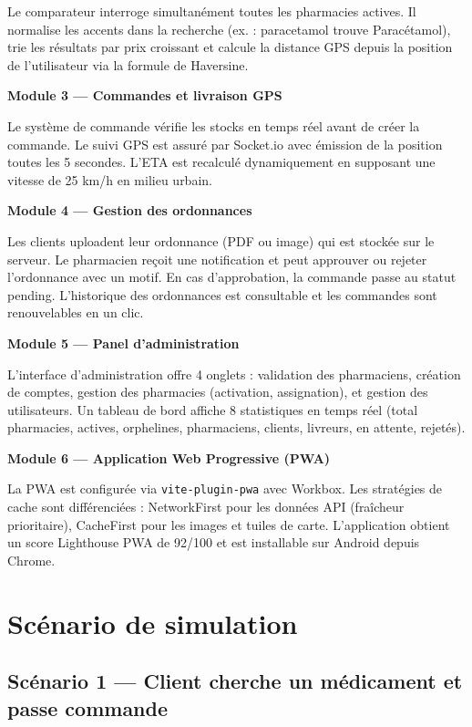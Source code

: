 \documentclass[12pt,a4paper,oneside]{report}
\begin{document}
Le comparateur interroge simultanément toutes les pharmacies actives. Il normalise les accents dans la recherche (ex. : \og{}paracetamol\fg{} trouve \og{}Paracétamol\fg{}), trie les résultats par prix croissant et calcule la distance GPS depuis la position de l'utilisateur via la formule de Haversine.

\textbf{Module 3 — Commandes et livraison GPS}

Le système de commande vérifie les stocks en temps réel avant de créer la commande. Le suivi GPS est assuré par Socket.io avec émission de la position toutes les 5 secondes. L'ETA est recalculé dynamiquement en supposant une vitesse de 25 km/h en milieu urbain.

\textbf{Module 4 — Gestion des ordonnances}

Les clients uploadent leur ordonnance (PDF ou image) qui est stockée sur le serveur. Le pharmacien reçoit une notification et peut approuver ou rejeter l'ordonnance avec un motif. En cas d'approbation, la commande passe au statut \og{}pending\fg{}. L'historique des ordonnances est consultable et les commandes sont renouvelables en un clic.

\textbf{Module 5 — Panel d'administration}

L'interface d'administration offre 4 onglets : validation des pharmaciens, création de comptes, gestion des pharmacies (activation, assignation), et gestion des utilisateurs. Un tableau de bord affiche 8 statistiques en temps réel (total pharmacies, actives, orphelines, pharmaciens, clients, livreurs, en attente, rejetés).

\textbf{Module 6 — Application Web Progressive (PWA)}

La PWA est configurée via \texttt{vite-plugin-pwa} avec Workbox. Les stratégies de cache sont différenciées : NetworkFirst pour les données API (fraîcheur prioritaire), CacheFirst pour les images et tuiles de carte. L'application obtient un score Lighthouse PWA de 92/100 et est installable sur Android depuis Chrome.

\section{Scénario de simulation}

\subsection{Scénario 1 — Client cherche un médicament et passe commande}
\end{document}
